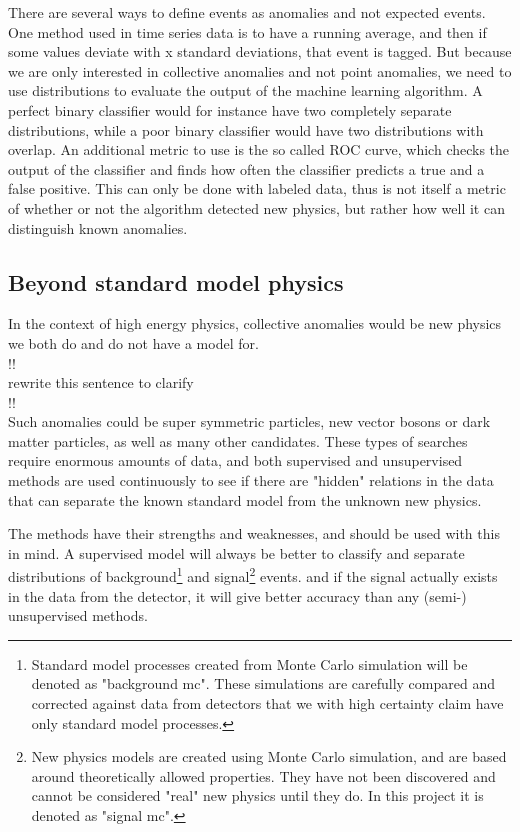 \documentclass[ reprint, amsmath,amssymb, aps, nofootinbib]{revtex4-2}
\begin{document}
There are several ways to define events as anomalies and not expected events. One method used in time series data is to have a running average, and then if some values deviate with x standard deviations, that event is tagged. But because we are only interested in collective anomalies and not point anomalies, we need to use distributions to evaluate the output of the machine learning algorithm. A perfect binary classifier would for instance have two completely separate distributions, while a poor binary classifier would have two distributions with overlap. An additional metric to use is the so called ROC curve, which checks the output of the classifier and finds how often the classifier predicts a true and a false positive. This can only be done with labeled data, thus is not itself a metric of whether or not the algorithm detected new physics, but rather how well it can distinguish known anomalies.

\subsection{Beyond standard model physics}




In the context of high energy physics, collective anomalies would be new physics we both do and do not have a model for.
\\!!\\
rewrite this sentence to clarify 
\\!!\\
Such anomalies could be super symmetric particles\cite{JMLR:v18:16-558}, new vector bosons or dark matter particles, as well as many other candidates. These types of searches require enormous amounts of data, and both supervised and unsupervised methods are used continuously to see if there are "hidden" relations in the data that can separate the known standard model from the unknown new physics. \par 

The methods have their strengths and weaknesses, and should be used with this in mind. A supervised model will always be better to classify and separate distributions of background\footnote{Standard model processes created from Monte Carlo simulation will be denoted as "background mc". These simulations are carefully compared and corrected against data from detectors that we with high certainty claim have only standard model processes.} and signal\footnote{New physics models are created using Monte Carlo simulation, and are based around theoretically allowed properties. They have not been discovered and cannot be considered "real" new physics until they do. In this project it is denoted as "signal mc".} events. and if the signal actually exists in the data from the detector, it will give better accuracy than any (semi-) unsupervised methods. \par 
\end{document}
